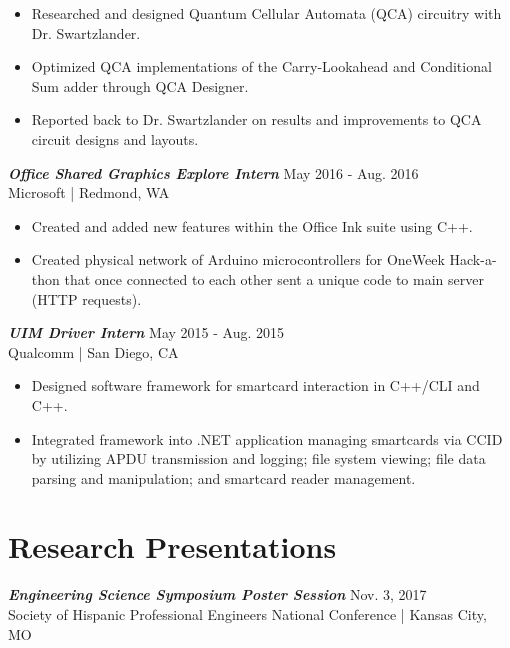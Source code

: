 \documentclass[letter]{res}
\begin{document}
\begin{resume}
 \vspace{-4mm}

 \begin{itemize}
 \item Researched and designed Quantum Cellular Automata (QCA) circuitry with Dr. Swartzlander.
 \item Optimized QCA implementations of the Carry-Lookahead and Conditional Sum adder through QCA Designer.
 \item Reported back to Dr. Swartzlander on results and improvements to QCA circuit designs and layouts.
 \end{itemize}
 
\vspace{-2mm}
   
{\sl \textbf{Office Shared Graphics Explore Intern}} \hfill May 2016 - Aug. 2016\\
Microsoft | Redmond, WA \newline
 \vspace{-4mm}
  \begin{itemize}
  \item Created and added new features within the Office Ink suite using C++.
  \item Created physical network of Arduino microcontrollers for OneWeek Hack-a-thon that once connected to each other sent a unique code to main server (HTTP requests).
  \end{itemize}
  
\vspace{-2mm}

{\sl \textbf{UIM Driver Intern}} \hfill May 2015 - Aug. 2015\\
Qualcomm | San Diego, CA \newline
 
 \vspace{-4mm}
 
 \begin{itemize}
 \item Designed software framework for smartcard interaction in C++/CLI and C++.
 \item Integrated framework into .NET application managing smartcards via CCID by utilizing APDU transmission and logging; file system viewing; file data parsing and manipulation; and smartcard reader management.
 \end{itemize}

\vspace{-4mm}

\section{Research Presentations}
{\sl \textbf{Engineering Science Symposium Poster Session}} \hfill Nov. 3, 2017\\
Society of Hispanic Professional Engineers National Conference | Kansas City, MO \newline


\end{resume}
\end{document}
